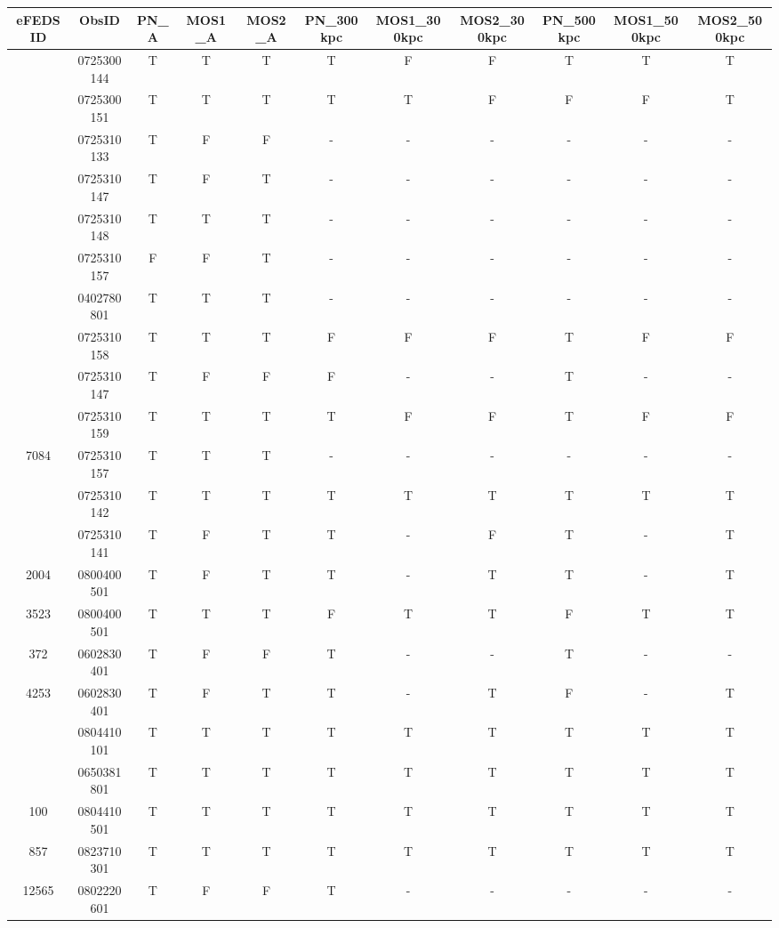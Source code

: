 \documentclass[fleqn,usenatbib]{mnras}
\begin{document}
\begin{table}
\begin{center}
\contcaption{{}}
\vspace{1mm}
\begin{tabular}{ccccccccccc}
\hline
\hline
eFEDS ID & ObsID & PN_\rm{A} & MOS1_\rm{A} & MOS2_\rm{A} & PN_\rm{300kpc} & MOS1_\rm{300kpc} & MOS2_\rm{300kpc} & PN_\rm{500kpc} & MOS1_\rm{500kpc} & MOS2_\rm{500kpc}\\
\hline
\hline

\multirow{2}{4em}{\centering 3259} & 0725300144 & T & T & T & T & F & F & T & T & T \\ & 0725300151 & T & T & T & T & T & F & F & F & T \\ 
\hline
\multirow{5}{4em}{\centering 7086} & 0725310133 & T & F & F & - & - & - & - & - & - \\ & 0725310147 & T & F & T & - & - & - & - & - & - \\ & 0725310148 & T & T & T & - & - & - & - & - & - \\ & 0725310157 & F & F & T & - & - & - & - & - & - \\ & 0402780801 & T & T & T & - & - & - & - & - & - \\ 
\hline
\multirow{3}{4em}{\centering 5219} & 0725310158 & T & T & T & F & F & F & T & F & F \\ & 0725310147 & T & F & F & F & - & - & T & - & - \\ & 0725310159 & T & T & T & T & F & F & T & F & F \\ 
\hline
7084 & 0725310157 & T & T & T & - & - & - & - & - & - \\ 
\hline
\multirow{2}{4em}{\centering 885} & 0725310142 & T & T & T & T & T & T & T & T & T \\ & 0725310141 & T & F & T & T & - & F & T & - & T \\ 
\hline
2004 & 0800400501 & T & F & T & T & - & T & T & - & T \\ 
\hline
3523 & 0800400501 & T & T & T & F & T & T & F & T & T \\ 
\hline
372 & 0602830401 & T & F & F & T & - & - & T & - & - \\ 
\hline
4253 & 0602830401 & T & F & T & T & - & T & F & - & T \\ 
\hline
\multirow{2}{4em}{\centering 534} & 0804410101 & T & T & T & T & T & T & T & T & T \\ & 0650381801 & T & T & T & T & T & T & T & T & T \\ 
\hline
100 & 0804410501 & T & T & T & T & T & T & T & T & T \\ 
\hline
857 & 0823710301 & T & T & T & T & T & T & T & T & T \\ 
\hline
12565 & 0802220601 & T & F & F & T & - & - & - & - & - \\ 
\hline

\end{tabular}
\end{center}
\end{table}
\end{document}
